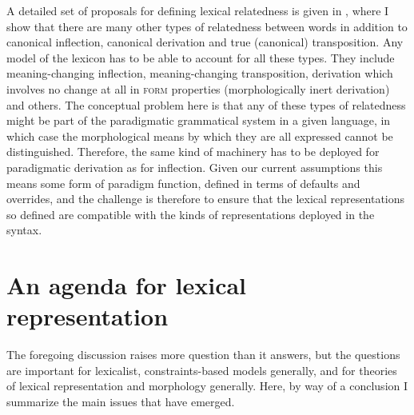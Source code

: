\documentclass[output=paper]{langsci/langscibook}
\begin{document}
\begin{sloppypar}
A detailed set of proposals for defining lexical relatedness is given in %
\citet{Spencer13}%
%
, where I show that there are many other types of relatedness between words in addition to canonical inflection, canonical derivation and true (canonical) transposition. Any model of the lexicon has to be able to account for all these types. They include meaning-changing inflection,  meaning-changing transposition, derivation which involves no change at all in \textsc{form} properties (morphologically inert derivation) and others. The conceptual problem here is that any of these types of relatedness might be part of the paradigmatic grammatical system in a given language, in which case the morphological means by which they are all expressed cannot be distinguished. Therefore, the same kind of machinery has to be deployed for paradigmatic derivation as for inflection. Given our current assumptions this means some form of paradigm function, defined in terms of defaults and overrides, and the challenge is therefore to ensure that the lexical representations so defined are compatible with the kinds of representations deployed in the syntax.
\end{sloppypar}






\section{An agenda for lexical representation} \label{sec:Spencer:agenda}

The foregoing discussion raises more question than it answers, but the questions are important for lexicalist, constraints-based models generally, and for theories of lexical representation and morphology generally. Here, by way of a conclusion I summarize the main issues that have emerged.
\end{document}
